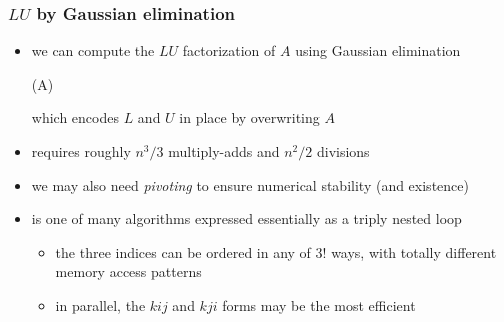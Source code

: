 \begin{frame}[fragile]
%
  \frametitle{$LU$ by Gaussian elimination}
%
  \begin{itemize}
%
  \item we can compute the $LU$ factorization of $A$ using Gaussian elimination
    \begin{center}
      \begin{minipage}{.85\linewidth}
        \begin{algorithm}[H]
          \label{alg:LU-gaussian}
%
          \dontprintsemicolon
          \setalcaphskip{0ex}
%
          \caption{\lu(A)}
%
%
        \end{algorithm}
      \end{minipage}
    \end{center}
%
    which encodes $L$ and $U$ in place by overwriting $A$
%
  \item {} requires roughly $n^{3}/3$ multiply-adds and $n^{2}/2$ divisions
%
  \item we may also need {\em pivoting} to ensure numerical stability (and existence)
%
  \item {} is one of many algorithms expressed essentially as a triply nested loop
    \begin{itemize}
    \item the three indices can be ordered in any of $3!$ ways, with totally different memory
      access patterns
    \item in parallel, the $kij$ and $kji$ forms may be the most efficient
    \end{itemize}
%
  \end{itemize}
%
\end{frame}
%

